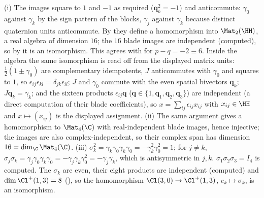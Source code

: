 (i) The images square to $1$ and $-1$ as required ($\mathbf{q}_k^{2} = -1$) and anticommute: $\gamma_0$ against $\gamma_k$ by the sign pattern of the blocks, $\gamma_j$ against $\gamma_k$ because distinct quaternion units anticommute. By  they define a homomorphism into $\Mat_2(\HH)$, a real algebra of dimension $16$; the $16$ blade images are independent (computed), so by  it is an isomorphism. This agrees with  for $p - q = -2 \equiv 6$. Inside the algebra the same isomorphism is read off from the displayed matrix units: $\tfrac12(1 \pm \gamma_0)$ are complementary idempotents, $J$ anticommutes with $\gamma_0$ and squares to $1$, so $\epsilon_{ij}\epsilon_{kl} = \delta_{jk}\epsilon_{il}$; $J$ and $\gamma_0$ commute with the even spatial bivectors $\mathbf{q}_k$; $J\mathbf{q}_k = \gamma_k$; and the sixteen products $\epsilon_{ij}\mathbf{q}$ ($\mathbf{q} \in \{1, \mathbf{q}_1, \mathbf{q}_2, \mathbf{q}_3\}$) are independent (a direct computation of their blade coefficients), so $x = \sum_{ij}\epsilon_{ij}x_{ij}$ with $x_{ij} \in \HH$ and $x \mapsto (x_{ij})$ is the displayed assignment. (ii) The same argument gives a homomorphism to $\Mat_4(\C)$ with real-independent blade images, hence injective; the images are also complex-independent, so their complex span has dimension $16 = \dim_\C \Mat_4(\C)$. (iii) $\sigma_k^{2} = \gamma_k\gamma_0\gamma_k\gamma_0 = -\gamma_k^{2}\gamma_0^{2} = 1$; for $j \ne k$, $\sigma_j\sigma_k = \gamma_j\gamma_0\gamma_k\gamma_0 = -\gamma_j\gamma_k\gamma_0^{2} = -\gamma_j\gamma_k$, which is antisymmetric in $j, k$. $\sigma_1\sigma_2\sigma_3 = I_4$ is computed. The $\sigma_k$ are even, their eight products are independent (computed) and $\dim \Cl^{+}(1,3) = 8$ (), so the homomorphism $\Cl(3,0) \to \Cl^{+}(1,3)$, $e_k \mapsto \sigma_k$, is an isomorphism.
